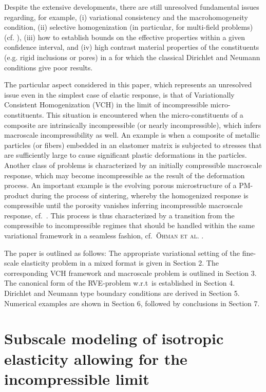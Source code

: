 \documentclass{bmcart}
\begin{document}
Despite the extensive developments, there are still unresolved fundamental issues regarding, for example, (i) variational consistency and the macrohomogeneity condition,
(ii) selective homogenization (in particular, for multi-field problems) (cf. \cite{sandstrom_variationally_2012}),
(iii) how to establish bounds on the effective properties within a given confidence interval, and (iv) high contrast material properties of the constituents (e.g. rigid inclusions or pores) in a for which the classical Dirichlet and Neumann conditions give poor results.

The particular aspect considered in this paper, which represents an unresolved issue even in the simplest case of elastic response, is that of Variationally Consistent Homogenization (VCH) in the limit of incompressible micro-constituents.
This situation is encountered when the micro-constituents of a composite are intrinsically incompressible (or nearly incompressible), which infers macroscale incompressibility as well.
An example is when a composite of metallic particles (or fibers) embedded in an elastomer matrix is subjected to stresses that are sufficiently large to cause significant plastic deformations in the particles.
Another class of problems is characterized by an initially compressible macroscale response, which may become incompressible as the result of the deformation process.
An important example is the evolving porous microstructure of a PM-product during the process of sintering, whereby the homogenized response is compressible until the porosity vanishes inferring incompressible macroscale response, cf.\ \cite{olevsky_theory_1998}.
This process is thus characterized by a transition from the compressible to incompressible regimes that should be handled within the same variational framework in a seamless fashion, cf.\  \textsc{Öhman et al.} \cite{ohman_computational_2013}.

The paper is outlined as follows:
The appropriate variational setting of the fine-scale elasticity problem in a mixed format is given in Section 2.
The corresponding VCH framework and macroscale problem is outlined in Section 3.
The canonical form of the RVE-problem w.r.t\ is established in Section 4.
Dirichlet and Neumann type boundary conditions are derived in Section 5.
Numerical examples are shown in Section 6, followed by conclusions in Section 7.


\section{Subscale modeling of isotropic elasticity allowing for the incompressible limit}
\end{document}

